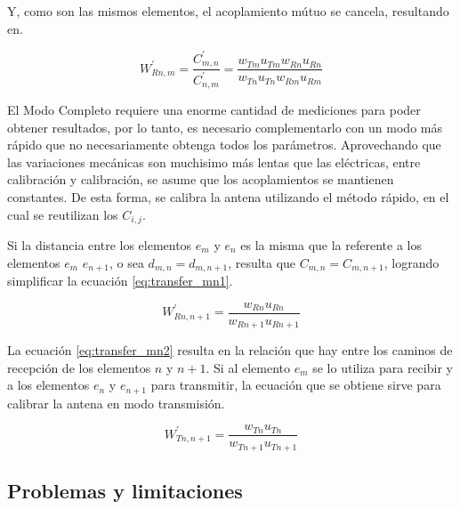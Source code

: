Y, como son las mismos elementos, el acoplamiento mútuo se cancela, resultando en.

\begin{equation}
	W^{'}_{Rn,m} = \dfrac{C^{'}_{m,n}}{C^{'}_{n, m}} = \dfrac{w_{Tm} u_{Tm} w_{Rn} u_{Rn}}{w_{Tn} u_{Tn} w_{Rm} u_{Rm}}
	\label{eq:transfer_mn4}
\end{equation}


El Modo Completo requiere una enorme cantidad de mediciones para poder obtener resultados, por lo tanto, es necesario 
complementarlo con un modo más rápido que no necesariamente obtenga todos los parámetros. Aprovechando que las variaciones 
mecánicas son muchisimo más lentas que las eléctricas, entre calibración y calibración, se asume que los acoplamientos se 
mantienen constantes. De esta forma, se calibra la antena utilizando el método rápido, en el cual se reutilizan los $C_{i, j}$. 

Si la distancia entre los elementos $e_m$ y $e_n$ es la misma que la referente a los elementos $e_m$ $e_{n+1}$, o sea 
$d_{m,n} = d_{m,n+1}$, resulta que $C_{m,n} = C_{m, n + 1}$, logrando simplificar la ecuación \ref{eq:transfer_mn1}.

\begin{equation}
	W^{'}_{Rn,n + 1} = \dfrac{w_{Rn} u_{Rn}}{w_{Rn + 1} u_{Rn + 1}}
	\label{eq:transfer_mn2}
\end{equation}

La ecuación \ref{eq:transfer_mn2} resulta en la relación que hay entre los caminos de recepción de los elementos $n$ y 
$n+1$. Si al elemento $e_m$ se lo utiliza para recibir y a los elementos $e_n$ y $e_{n + 1}$ para transmitir, la ecuación que se 
obtiene sirve para calibrar la antena en modo transmisión.

\begin{equation}
	W^{'}_{Tn,n + 1} = \dfrac{w_{Tn} u_{Tn}}{w_{Tn + 1} u_{Tn + 1}}
\end{equation}



\subsection{Problemas y limitaciones}


